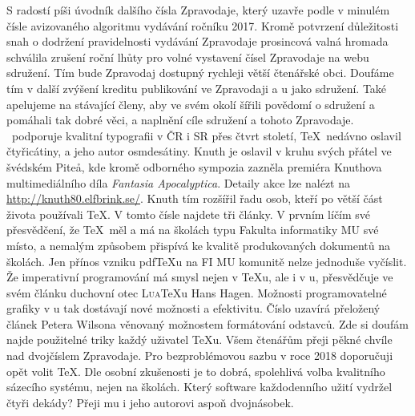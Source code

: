 S radostí píši úvodník dalšího čísla Zpravodaje, který uzavře podle v minulém čísle avizovaného algoritmu vydávání ročníku 2017. Kromě potvrzení důležitosti snah o dodržení pravidelnosti vydávání Zpravodaje prosincová valná hromada schválila zrušení roční lhůty pro volné vystavení čísel Zpravodaje na webu sdružení.  Tím bude Zpravodaj dostupný rychleji větší čtenářské obci.  Doufáme tím v další zvýšení kreditu publikování ve Zpravodaji a \CSTUG u jako sdružení. Také apelujeme na stávající členy, aby ve svém okolí šířili povědomí o sdružení a pomáhali tak dobré věci, a naplnění cíle sdružení a tohoto Zpravodaje.
\CSTUG\ podporuje kvalitní typografii v ČR i SR přes čtvrt století, \TeX\ nedávno oslavil čtyřicátiny, a jeho autor osmdesátiny. Knuth je oslavil v kruhu svých přátel ve švédském Pite\r{a}, kde kromě odborného sympozia zazněla    premiéra Knuthova multimediálního díla \emph{Fantasia Apocalyptica}.  Detaily akce lze nalézt na \url{http://knuth80.elfbrink.se/}.  Knuth tím rozšířil řadu osob, kteří po větší část života používali \TeX.
V tomto čísle najdete tři články.  V prvním líčím své přesvědčení, že \TeX\ měl a má na školách typu Fakulta informatiky MU své místo, a nemalým způsobem přispívá ke kvalitě produkovaných dokumentů na školách.  Jen přínos vzniku pdf\TeX u na FI MU komunitě nelze jednoduše vyčíslit.
Že imperativní programování má smysl nejen v \TeX u, ale i v \MP u, přesvědčuje ve svém článku duchovní otec \textsc{Lua}\TeX u Hans Hagen. Možnosti programovatelné grafiky v \MP u tak dostávají nové možnosti a efektivitu.
Číslo uzavírá přeložený článek Petera Wilsona věnovaný možnostem formátování odstavců.  Zde si doufám najde použitelné triky každý uživatel \TeX u.
Všem čtenářům přeji pěkné chvíle nad dvojčíslem Zpravodaje.  Pro bezproblémovou sazbu v roce 2018 doporučuji opět volit \TeX.  Dle osobní zkušenosti je to dobrá, spolehlivá volba kvalitního sázecího systému, nejen na školách.  Který software každodenního užití vydržel čtyři dekády?  Přeji mu i jeho autorovi aspoň dvojnásobek.
